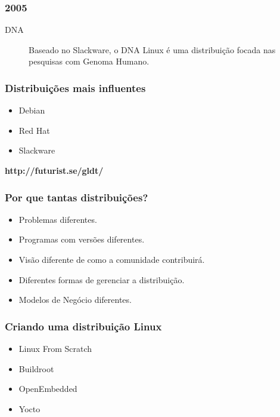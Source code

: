 \documentclass[aspectratio=169,14pt]{beamer}
\begin{document}
\begin{frame}
    \frametitle{2005}
    \begin{description}
        \item[DNA] Baseado no Slackware, o DNA Linux é uma distribuição
        focada nas pesquisas com Genoma Humano.
    \end{description}
\end{frame}

\begin{frame}
    \frametitle{Distribuições mais influentes}
    \begin{itemize}
        \item Debian
        \item Red Hat
        \item Slackware
    \end{itemize}
\end{frame}

\begin{frame}
    \begin{center}
    \huge \textbf{http://futurist.se/gldt/}
    \end{center}
\end{frame}

\begin{frame}
    \frametitle{Por que tantas distribuições?}
    \begin{itemize}
        \item Problemas diferentes.
        \item Programas com versões diferentes.
        \item Visão diferente de como a comunidade contribuirá.
        \item Diferentes formas de gerenciar a distribuição.
        \item Modelos de Negócio diferentes.
    \end{itemize}
\end{frame}

\begin{frame}
    \frametitle{Criando uma distribuição Linux}
    \begin{itemize}
        \item Linux From Scratch
        \item Buildroot
        \item OpenEmbedded
        \item Yocto
    \end{itemize}
\end{frame}
\end{document}
